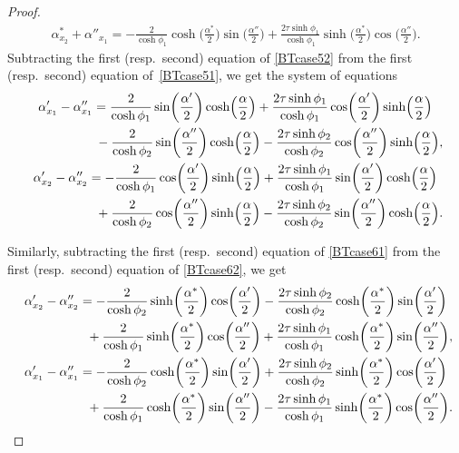 \documentclass[pdftex]{sigma}
\numberwithin{equation}{section}
\begin{document}
\begin{proof}
\begin{gather}
\alpha^*_{x_2}+\alpha''_{x_1}=-\frac{2}{\cosh\phi_1}\cosh\biggl(\frac{\alpha^*}{2}\biggr)\sin\biggl(\frac{\alpha''}{2}\biggr)+\frac{2\tau\sinh\phi_1}{\cosh\phi_1} \sinh\biggl(\frac{\alpha^*}{2}\biggr)\cos\biggl(\frac{\alpha''}{2}\biggr).\label{BTcase61}
\end{gather}
Subtracting the first (resp.\ second) equation of \eqref{BTcase52} from the first (resp.\ second) equation of~\eqref{BTcase51}, we get the system of equations
\begin{gather}
\alpha'_{x_1}-\alpha''_{x_1}=\frac{2}{\cosh\phi_1}\sin\biggl(\frac{\alpha'}{2}\biggr)\cosh \Bigl(\frac{\alpha}{2}\Bigr)+\frac{2\tau\sinh\phi_1}{\cosh\phi_1} \cos\biggl(\frac{\alpha'}{2}\biggr)\sinh\Bigl(\frac{\alpha}{2}\Bigr)
\nonumber\\ \hphantom{\alpha'_{x_1}-\alpha''_{x_1}=}{}
- \frac{2}{\cosh\phi_2}\sin\biggl(\frac{\alpha''}{2}\biggr)\cosh \Bigl(\frac{\alpha}{2}\Bigr)-\frac{2\tau\sinh\phi_2}{\cosh\phi_2} \cos\biggl(\frac{\alpha''}{2}\biggr)\sinh\Bigl(\frac{\alpha}{2}\Bigr),\nonumber\\
\alpha'_{x_2}-\alpha''_{x_2}= -\frac{2}{\cosh\phi_1}\cos\biggl(\frac{\alpha'}{2}\biggr)\sinh\Bigl(\frac{\alpha}{2}\Bigr)+\frac{2\tau\sinh\phi_1}{\cosh\phi_1} \sin\biggl(\frac{\alpha'}{2}\biggr)\cosh\Bigl(\frac{\alpha}{2}\Bigr)
\nonumber\\ \hphantom{\alpha'_{x_2}-\alpha''_{x_2}=}{}
+\frac{2}{\cosh\phi_2}\cos\biggl(\frac{\alpha''}{2}\biggr)\sinh\Bigl(\frac{\alpha}{2}\Bigr)-\frac{2\tau\sinh\phi_2}{\cosh\phi_2} \sin\biggl(\frac{\alpha''}{2}\biggr)\cosh\Bigl(\frac{\alpha}{2}\Bigr). \label{BT51minusBT52}
\end{gather}

Similarly, subtracting the first (resp.\ second) equation of \eqref{BTcase61} from the first (resp.\ second) equation of \eqref{BTcase62}, we get
\begin{gather}
\alpha'_{x_2}-\alpha''_{x_2}=-\frac{2}{\cosh\phi_2}\sinh\biggl(\frac{\alpha^*}{2}\biggr)\cos\biggl(\frac{\alpha'}{2}\biggr)-\frac{2\tau\sinh\phi_2}{\cosh\phi_2} \cosh\biggl(\frac{\alpha^*}{2}\biggr)\sin\biggl(\frac{\alpha'}{2}\biggr)
\nonumber\\ \hphantom{\alpha'_{x_2}-\alpha''_{x_2}=}{}
 +\frac{2}{\cosh\phi_1}\sinh\biggl(\frac{\alpha^*}{2}\biggr)\cos\biggl(\frac{\alpha''}{2}\biggr)+\frac{2\tau\sinh\phi_1}{\cosh\phi_1} \cosh\biggl(\frac{\alpha^*}{2}\biggr)\sin\biggl(\frac{\alpha''}{2}\biggr),\nonumber\\
\alpha'_{x_1}-\alpha''_{x_1}=-\frac{2}{\cosh\phi_ 2}\cosh\biggl(\frac{\alpha^*}{2}\biggr)\sin\biggl(\frac{\alpha'}{2}\biggr)+\frac{2\tau\sinh\phi_2}{\cosh\phi_2} \sinh\biggl(\frac{\alpha^*}{2}\biggr)\cos\biggl(\frac{\alpha'}{2}\biggr)
\nonumber\\ \hphantom{\alpha'_{x_1}-\alpha''_{x_1}=}{}
 +\frac{2}{\cosh\phi_1}\cosh\biggl(\frac{\alpha^*}{2}\biggr)\sin\biggl(\frac{\alpha''}{2}\biggr)- \frac{2\tau\sinh\phi_1}{\cosh\phi_1} \sinh\biggl(\frac{\alpha^*}{2}\biggr)\cos\biggl(\frac{\alpha''}{2}\biggr). \label{BT62minusBT61}
\end{gather}


\end{proof}
\end{document}
